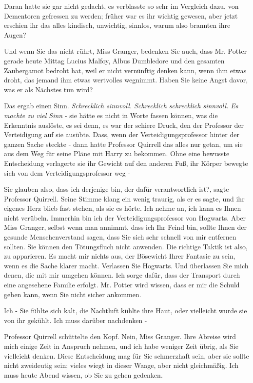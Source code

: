 Daran hatte sie gar nicht gedacht, es verblasste so sehr im Vergleich dazu, von
Dementoren gefressen zu werden; früher war es ihr wichtig gewesen, aber jetzt
erschien ihr das alles kindisch, unwichtig, sinnlos, warum also brannten ihre
Augen?

\glqq{}Und wenn Sie das nicht rührt, Miss Granger, bedenken Sie auch, dass Mr.
Potter gerade heute Mittag Lucius Malfoy, Albus Dumbledore und den gesamten
Zaubergamot bedroht hat, weil er nicht vernünftig denken kann, wenn ihm etwas
droht, das jemand ihm etwas wertvolles wegnimmt. Haben Sie keine Angst davor,
was er als Nächstes tun wird?\grqq{}

Das ergab einen Sinn. \emph{Schrecklich sinnvoll. Schrecklich schrecklich
sinnvoll. Es machte zu viel Sinn} - sie hätte es nicht in Worte fassen können,
was die Erkenntnis auslöste, es sei denn, es war der schiere Druck, den der
Professor der Verteidigung auf sie ausübte. Dass, wenn der
Verteidigungsprofessor hinter der ganzen Sache steckte - dann hatte Professor
Quirrell das alles nur getan, um sie aus dem Weg für seine Pläne mit Harry zu
bekommen. Ohne eine bewusste Entscheidung verlagerte sie ihr Gewicht auf den
anderen Fuß, ihr Körper bewegte sich von dem Verteidigungsprofessor weg -

\glqq{}Sie glauben also, dass ich derjenige bin, der dafür verantwortlich
ist?\grqq{}, sagte Professor Quirrell. Seine Stimme klang ein wenig traurig, als
er es sagte, und ihr eigenes Herz blieb fast stehen, als sie es hörte. \glqq{}Ich
nehme an, ich kann es Ihnen nicht verübeln. Immerhin bin ich der
Verteidigungsprofessor von Hogwarts. Aber Miss Granger, selbst wenn man annimmt,
dass ich Ihr Feind bin, sollte Ihnen der gesunde Menschenverstand sagen, dass
Sie sich sehr schnell von mir entfernen sollten. Sie können den Tötungsfluch
nicht anwenden. Die richtige Taktik ist also, zu apparieren. Es macht mir nichts
aus, der Bösewicht Ihrer Fantasie zu sein, wenn es die Sache klarer macht.
Verlassen Sie Hogwarts. Und überlassen Sie mich denen, die mit mir umgehen
können. Ich sorge dafür, dass der Transport durch eine angesehene Familie
erfolgt. Mr. Potter wird wissen, dass er mir die Schuld geben kann, wenn Sie
nicht sicher ankommen.

\glqq{}Ich -\grqq{} Sie fühlte sich kalt, die Nachtluft kühlte ihre Haut, oder
vielleicht wurde sie von ihr gekühlt. \glqq{}Ich muss darüber nachdenken -\grqq{}

Professor Quirrell schüttelte den Kopf. \glqq{}Nein, Miss Granger. Ihre Abreise
wird mich einige Zeit in Anspruch nehmen, und ich habe weniger Zeit übrig, als
Sie vielleicht denken. Diese Entscheidung mag für Sie schmerzhaft sein, aber sie
sollte nicht zweideutig sein; vieles wiegt in dieser Waage, aber nicht
gleichmäßig. Ich muss heute Abend wissen, ob Sie zu gehen gedenken.\grqq{}

